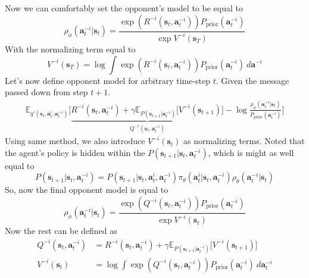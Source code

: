 Now we can comfortably set the opponent's model to be equal to 
\begin{equation}
    \rho_{\phi}(\boldsymbol{a}^{-i}_t | \boldsymbol{s}_t) = \frac{\exp\left(R^{-i}(\boldsymbol{s}_{t}, \boldsymbol{a}^{-i}_{t})\right)P_{\text{prior}}(\boldsymbol{a}^{-i}_t)}{\exp V^{-i}(\boldsymbol{s}_T)}
\end{equation}
With the normalizing term equal to 
\begin{equation}
    V^{-i}(\boldsymbol{s}_T) = \log \int \exp\left(R^{-i}(\boldsymbol{s}_{t}, \boldsymbol{a}^{-i}_{t})\right)P_{\text{prior}}(\boldsymbol{a}^{-i}_t) \ d \boldsymbol{a}^{-i}
\end{equation}
Let's now define opponent model for arbitrary time-step $t$. Given the message passed down from step $t+1$. 
\begin{equation}
    \begin{aligned}
        \mathbb{E}_{q'(\boldsymbol{s}_{t}, \boldsymbol{a}^i_{t}, \boldsymbol{a}^{-i}_{t})} \Bigg[\underbrace{R^{-i}(\boldsymbol{s}_{t}, \boldsymbol{a}^{-i}_{t}) + \gamma\mathbb{E}_{P(\boldsymbol{s}_{t+1}| \boldsymbol{a}^{-i}_{t})}\Big[ V^{-i}(\boldsymbol{s}_{t+1}) \Big]}_{Q^{-i}(\boldsymbol{s}_t, \boldsymbol{a}^{-i}_t)} - \log \frac{\rho_{\phi}(\boldsymbol{a}^{-i}_t | \boldsymbol{s}_t)}{P_{\text{prior}}(\boldsymbol{a}^{-i}_t)} \Bigg]
    \end{aligned}
\end{equation}
Using same method, we also introduce $V^{-i}(\boldsymbol{s}_{t})$ as normalizing terms. Noted that the agent's policy is hidden within the $P(\boldsymbol{s}_{t+1} | \boldsymbol{s}_{t}, \boldsymbol{a}^{-i}_t)$, which is might as well equal to 
\begin{equation}
    P(\boldsymbol{s}_{t+1} | \boldsymbol{s}_{t}, \boldsymbol{a}^{-i}_t) = P(\boldsymbol{s}_{t+1} | \boldsymbol{s}_t, \boldsymbol{a}^i_t, \boldsymbol{a}^{-i}_t) \pi_{\theta}(\boldsymbol{a}^i_t | \boldsymbol{s}_t, \boldsymbol{a}^{-i}_t) \rho_{\theta}(\boldsymbol{a}^{-i}_t | \boldsymbol{s}_t)
\end{equation}
So, now the final opponent model is equal to 
\begin{equation}
    \rho_{\phi}(\boldsymbol{a}^{-i}_t | \boldsymbol{s}_t) = \frac{\exp\left( Q^{-i}(\boldsymbol{s}_t, \boldsymbol{a}^{-i}_t) \right)P_{\text{prior}}(\boldsymbol{a}^{-i}_t)}{\exp V^{-i}(\boldsymbol{s}_{t})}
\end{equation}
Now the rest can be defined as 
\begin{equation}
    \begin{aligned}
        Q^{-i}(\boldsymbol{s}_{t}, \boldsymbol{a}^{-i}_t) &= R^{-i}(\boldsymbol{s}_{t}, \boldsymbol{a}^{-i}_{t}) + \gamma\mathbb{E}_{P(\boldsymbol{s}_{t+1}| \boldsymbol{a}^{-i}_{t})}\Big[ V^{-i}(\boldsymbol{s}_{t+1}) \Big] \\
        V^{-i}(\boldsymbol{s}_{t}) &= \log \int \exp\left( Q^{-i}(\boldsymbol{s}_t, \boldsymbol{a}^{-i}_t) \right)P_{\text{prior}}(\boldsymbol{a}^{-i}_t) \ d\boldsymbol{a}^{-i}_t
    \end{aligned}
\end{equation}

